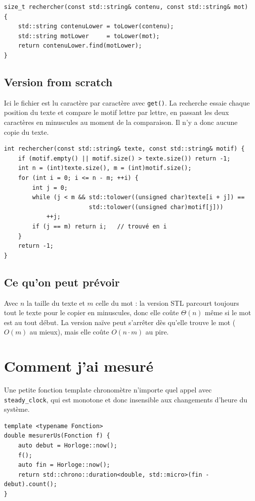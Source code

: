 \documentclass[11pt,a4paper]{article}
\begin{document}
\begin{lstlisting}[caption={Recherche avec la STL.}]
size_t rechercher(const std::string& contenu, const std::string& mot) {
    std::string contenuLower = toLower(contenu);
    std::string motLower     = toLower(mot);
    return contenuLower.find(motLower);
}
\end{lstlisting}

\subsection{Version from scratch}
Ici le fichier est lu caractère par caractère avec \texttt{get()}. La recherche essaie
chaque position du texte et compare le motif lettre par lettre, en passant les deux
caractères en minuscules au moment de la comparaison. Il n'y a donc aucune copie du texte.

\begin{lstlisting}[caption={Recherche écrite à la main.}]
int rechercher(const std::string& texte, const std::string& motif) {
    if (motif.empty() || motif.size() > texte.size()) return -1;
    int n = (int)texte.size(), m = (int)motif.size();
    for (int i = 0; i <= n - m; ++i) {
        int j = 0;
        while (j < m && std::tolower((unsigned char)texte[i + j]) ==
                        std::tolower((unsigned char)motif[j]))
            ++j;
        if (j == m) return i;   // trouvé en i
    }
    return -1;
}
\end{lstlisting}

\subsection{Ce qu'on peut prévoir}
Avec $n$ la taille du texte et $m$ celle du mot : la version STL parcourt toujours tout
le texte pour le copier en minuscules, donc elle coûte $\Theta(n)$ même si le mot est au
tout début. La version naïve peut s'arrêter dès qu'elle trouve le mot ($O(m)$ au mieux),
mais elle coûte $O(n\cdot m)$ au pire.

\section{Comment j'ai mesuré}

Une petite fonction template chronomètre n'importe quel appel avec \texttt{steady\_clock},
qui est monotone et donc insensible aux changements d'heure du système.

\begin{lstlisting}[caption={Chronométrage d'un appel, en microsecondes.}]
template <typename Fonction>
double mesurerUs(Fonction f) {
    auto debut = Horloge::now();
    f();
    auto fin = Horloge::now();
    return std::chrono::duration<double, std::micro>(fin - debut).count();
}
\end{lstlisting}
\end{document}
